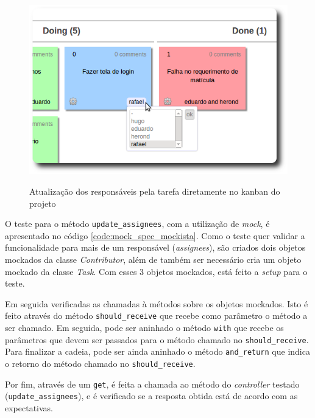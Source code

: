 \begin{figure}[h]
  \center
  \caption{Atualização dos responsáveis pela tarefa diretamente no kanban do projeto}
  \includegraphics[scale=0.55]{images/edit-contributors}
  \label{img:edit-contributors}
\end{figure}

O teste para o método \texttt{update\_assignees}, com a utilização de \textit{mock}, é apresentado no código \ref{code:mock_spec_mockista}. Como o teste quer validar a funcionalidade para mais de um responsável (\textit{assignees}), são criados dois objetos mockados da classe \textit{Contributor}, além de também ser necessário cria um objeto mockado da classe \textit{Task}. Com esses 3 objetos mockados, está feito a \textit{setup} para o teste.

Em seguida verificadas as chamadas à métodos sobre os objetos mockados. Isto é feito através do método \texttt{should\_receive} que recebe como parâmetro o método a ser chamado. Em seguida, pode ser aninhado o método \texttt{with} que recebe os parâmetros que devem ser passados para o método chamado no \texttt{should\_receive}. Para finalizar a cadeia, pode ser ainda aninhado o método \texttt{and\_return} que indica o retorno do método chamado no \texttt{should\_receive}.

Por fim, através de um \texttt{get}, é feita a chamada ao método do \textit{controller} testado (\texttt{update\_assignees}), e é verificado se a resposta obtida está de acordo com as expectativas.

